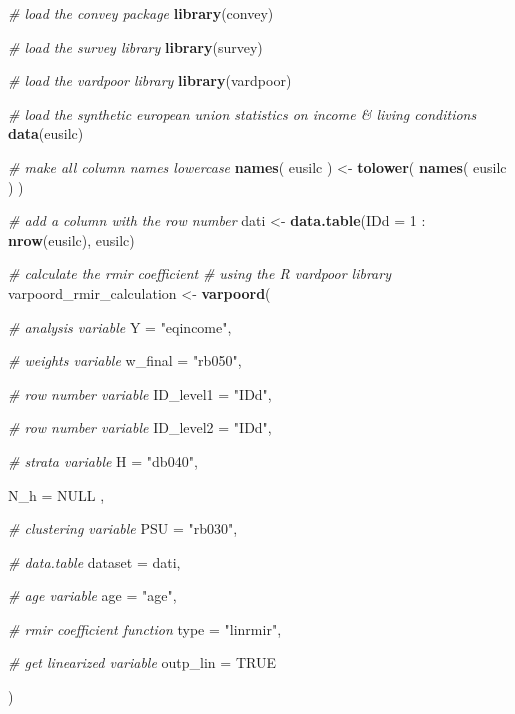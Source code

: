 \documentclass[]{book}
\newenvironment{Shaded}{\begin{snugshade}}{\end{snugshade}}
\newcommand{\KeywordTok}[1]{\textcolor[rgb]{0.13,0.29,0.53}{\textbf{{#1}}}}
\newcommand{\DataTypeTok}[1]{\textcolor[rgb]{0.13,0.29,0.53}{{#1}}}
\newcommand{\DecValTok}[1]{\textcolor[rgb]{0.00,0.00,0.81}{{#1}}}
\newcommand{\StringTok}[1]{\textcolor[rgb]{0.31,0.60,0.02}{{#1}}}
\newcommand{\CommentTok}[1]{\textcolor[rgb]{0.56,0.35,0.01}{\textit{{#1}}}}
\newcommand{\OtherTok}[1]{\textcolor[rgb]{0.56,0.35,0.01}{{#1}}}
\newcommand{\NormalTok}[1]{{#1}}
\theoremstyle{definition}
\theoremstyle{definition}
\theoremstyle{remark}
\begin{document}
\begin{Shaded}
\begin{Highlighting}[]
\CommentTok{# load the convey package}
\KeywordTok{library}\NormalTok{(convey)}

\CommentTok{# load the survey library}
\KeywordTok{library}\NormalTok{(survey)}

\CommentTok{# load the vardpoor library}
\KeywordTok{library}\NormalTok{(vardpoor)}

\CommentTok{# load the synthetic european union statistics on income & living conditions}
\KeywordTok{data}\NormalTok{(eusilc)}

\CommentTok{# make all column names lowercase}
\KeywordTok{names}\NormalTok{( eusilc ) <-}\StringTok{ }\KeywordTok{tolower}\NormalTok{( }\KeywordTok{names}\NormalTok{( eusilc ) )}

\CommentTok{# add a column with the row number}
\NormalTok{dati <-}\StringTok{ }\KeywordTok{data.table}\NormalTok{(}\DataTypeTok{IDd =} \DecValTok{1} \NormalTok{:}\StringTok{ }\KeywordTok{nrow}\NormalTok{(eusilc), eusilc)}

\CommentTok{# calculate the rmir coefficient}
\CommentTok{# using the R vardpoor library}
\NormalTok{varpoord_rmir_calculation <-}
\StringTok{    }\KeywordTok{varpoord}\NormalTok{(}
    
        \CommentTok{# analysis variable}
        \DataTypeTok{Y =} \StringTok{"eqincome"}\NormalTok{, }
        
        \CommentTok{# weights variable}
        \DataTypeTok{w_final =} \StringTok{"rb050"}\NormalTok{,}
        
        \CommentTok{# row number variable}
        \DataTypeTok{ID_level1 =} \StringTok{"IDd"}\NormalTok{,}
        
        \CommentTok{# row number variable}
        \DataTypeTok{ID_level2 =} \StringTok{"IDd"}\NormalTok{,}
        
        \CommentTok{# strata variable}
        \DataTypeTok{H =} \StringTok{"db040"}\NormalTok{, }
        
        \DataTypeTok{N_h =} \OtherTok{NULL} \NormalTok{,}
        
        \CommentTok{# clustering variable}
        \DataTypeTok{PSU =} \StringTok{"rb030"}\NormalTok{, }
        
        \CommentTok{# data.table}
        \DataTypeTok{dataset =} \NormalTok{dati,}
      
      \CommentTok{# age variable}
      \DataTypeTok{age =} \StringTok{"age"}\NormalTok{,}
        
        \CommentTok{# rmir coefficient function}
        \DataTypeTok{type =} \StringTok{"linrmir"}\NormalTok{,}
      
      \CommentTok{# get linearized variable}
      \DataTypeTok{outp_lin =} \OtherTok{TRUE}
        
    \NormalTok{)}
\end{Highlighting}
\end{Shaded}
\end{document}
